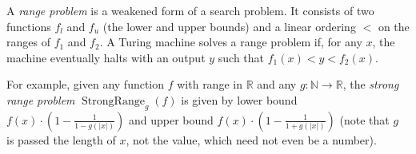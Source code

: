 \documentclass[12pt]{article}
\begin{document}
A \emph{range problem} is a weakened form of a search problem.  It consists of two functions $f_l$ and $f_u$ (the lower and upper bounds) and a linear ordering $<$ on the ranges of $f_1$ and $f_2$.  A Turing machine solves a range problem if, for any $x$, the machine eventually halts with an output $y$ such that $f_1(x)<y<f_2(x)$.

For example, given any function $f$ with range in $\mathbb{R}$ and any $g:\mathbb{N}\rightarrow\mathbb{R}$, the \emph{strong range problem} $\operatorname{StrongRange}_g(f)$ is given by lower bound $f(x)\cdot(1-\frac{1}{1-g(|x|)})$ and upper bound $f(x)\cdot(1-\frac{1}{1+g(|x|)})$ (note that $g$ is passed the length of $x$, not the value, which need not even be a number).
\end{document}

